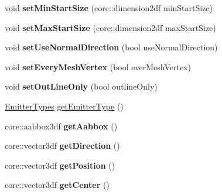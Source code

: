\begin{DoxyCompactItemize}
\item 
\hypertarget{class_particle_model_af8b287d8b304e9863399d14273810567}{void {\bfseries set\-Min\-Start\-Size} (core\-::dimension2df min\-Start\-Size)}\label{class_particle_model_af8b287d8b304e9863399d14273810567}

\item 
\hypertarget{class_particle_model_a5ce6ed84f6208430e09b690b829f4527}{void {\bfseries set\-Max\-Start\-Size} (core\-::dimension2df max\-Start\-Size)}\label{class_particle_model_a5ce6ed84f6208430e09b690b829f4527}

\item 
\hypertarget{class_particle_model_a9bd71de9e4797e2953506acebb075c17}{void {\bfseries set\-Use\-Normal\-Direction} (bool use\-Normal\-Direction)}\label{class_particle_model_a9bd71de9e4797e2953506acebb075c17}

\item 
\hypertarget{class_particle_model_ac293853e0f24a2381de32e22bdf4fbdb}{void {\bfseries set\-Every\-Mesh\-Vertex} (bool ever\-Mesh\-Vertex)}\label{class_particle_model_ac293853e0f24a2381de32e22bdf4fbdb}

\item 
\hypertarget{class_particle_model_ac26bcb202c3e649cd57af8423cc83ffd}{void {\bfseries set\-Out\-Line\-Only} (bool outline\-Only)}\label{class_particle_model_ac26bcb202c3e649cd57af8423cc83ffd}

\item 
\hyperlink{class_particle_model_a20dbdb2c6762bb19a57cb1553f73051f}{Emitter\-Types} \hyperlink{class_particle_model_a9d604becd6847bb1668d3bce13c230aa}{get\-Emitter\-Type} ()
\item 
\hypertarget{class_particle_model_a61bf5b4ba0d5a53bf77a9ad7b2fe144b}{core\-::aabbox3df {\bfseries get\-Aabbox} ()}\label{class_particle_model_a61bf5b4ba0d5a53bf77a9ad7b2fe144b}

\item 
\hypertarget{class_particle_model_ac53d29685a9387b1ba46ed1bb89ed1ad}{core\-::vector3df {\bfseries get\-Direction} ()}\label{class_particle_model_ac53d29685a9387b1ba46ed1bb89ed1ad}

\item 
\hypertarget{class_particle_model_a4a402145d1599967261f841f8a72d315}{core\-::vector3df {\bfseries get\-Position} ()}\label{class_particle_model_a4a402145d1599967261f841f8a72d315}

\item 
\hypertarget{class_particle_model_a8a13817f4470ab678e1fe153ff7df752}{core\-::vector3df {\bfseries get\-Center} ()}\label{class_particle_model_a8a13817f4470ab678e1fe153ff7df752}


\end{DoxyCompactItemize}
